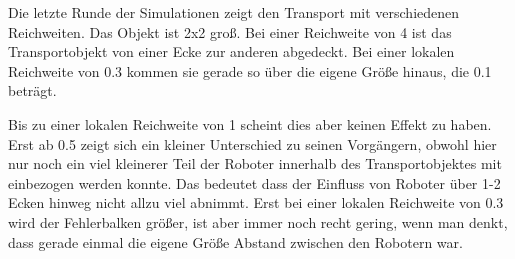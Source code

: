 Die letzte Runde der Simulationen zeigt den Transport mit verschiedenen Reichweiten. Das Objekt ist 2x2 groß. Bei einer Reichweite von 4 ist das Transportobjekt von einer Ecke zur anderen abgedeckt. Bei einer lokalen Reichweite von 0.3 kommen sie gerade so über die eigene Größe hinaus, die 0.1 beträgt.

Bis zu einer lokalen Reichweite von 1 scheint dies aber keinen Effekt zu haben. Erst ab 0.5 zeigt sich ein kleiner Unterschied zu seinen Vorgängern, obwohl hier nur noch ein viel kleinerer Teil der Roboter innerhalb des Transportobjektes mit einbezogen werden konnte. Das bedeutet dass der Einfluss von Roboter über 1-2 Ecken hinweg nicht allzu viel abnimmt. Erst bei einer lokalen Reichweite von 0.3 wird der Fehlerbalken größer, ist aber immer noch recht gering, wenn man denkt, dass gerade einmal die eigene Größe Abstand zwischen den Robotern war.

